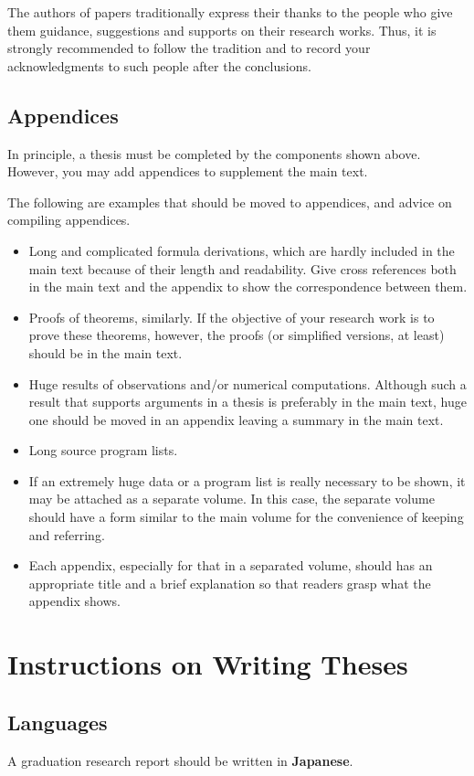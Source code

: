 \documentclass[master,english]{kuisthesis}
\let\EM\bf
\begin{document}
The authors of papers traditionally express their thanks to the people who
give them guidance, suggestions and supports on their research works.  Thus,
it is strongly recommended to follow the tradition and to record your
acknowledgments to such people after the conclusions.

\subsection{Appendices}\label{subsec-appendix}
In principle, a thesis must be completed by the components shown above.
However, you may add appendices to supplement the main text.

The following are examples that should be moved to appendices, and advice
on compiling appendices.
\begin{itemize}%
\item
Long and complicated formula derivations, which are hardly included in the
main text because of their length and readability.  Give cross references
both in the main text and the appendix to show the correspondence between
them.
\item
Proofs of theorems, similarly.  If the objective of your research work is to
prove these theorems, however, the proofs (or simplified versions, at least)
should be in the main text.
\item
Huge results of observations and/or numerical computations.  Although such a
result that supports arguments in a thesis is preferably in the main text,
huge one should be moved in an appendix leaving a summary in the main text.
\item
Long source program lists.
\item
If an extremely huge data or a program list is really necessary to be shown,
it may be attached as a separate volume.  In this case, the separate volume
should have a form similar to the main volume for the convenience of keeping
and referring.
\item
Each appendix, especially for that in a separated volume, should has an
appropriate title and a brief explanation so that readers grasp what the
appendix shows.
\end{itemize}%

\section{Instructions on Writing Theses}\label{sec-instruction}
\subsection{Languages}\label{subsec-language}
A graduation research report should be written in {\EM Japanese}.
\end{document}
